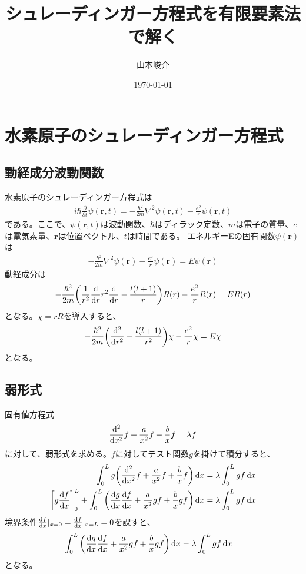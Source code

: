 \documentclass[xelatex,ja=standard]{bxjsarticle}
\title{シュレーディンガー方程式を有限要素法で解く}
\author{山本峻介}
\date{\today}
\begin{document}
\maketitle

\section{水素原子のシュレーディンガー方程式}
\subsection{動経成分波動関数}
水素原子のシュレーディンガー方程式は
\begin{align}
    i\hbar\frac{\partial}{\partial t}\psi(\bm{r},t) = -\frac{\hbar^2}{2m}\nabla^2\psi(\bm{r},t) -\frac{e^2}{r}\psi(\bm{r},t)
\end{align}
である。ここで、$\psi(\bm{r},t)$は波動関数、$\hbar$はディラック定数、$m$は電子の質量、$e$は電気素量、$\bm{r}$は位置ベクトル、$t$は時間である。
エネルギーEの固有関数$\psi(\bm{r})$は
\begin{align}
    -\frac{\hbar^2}{2m}\nabla^2\psi(\bm{r}) -\frac{e^2}{r}\psi(\bm{r}) = E\psi(\bm{r})
\end{align}
動経成分は
\begin{align}
    -\frac{\hbar^2}{2m}\qty(\frac{1}{r^2}\dv{r}r^2\dv{r} - \frac{l(l+1)}{r})R(r)
     - \frac{e^2}{r}R(r) = ER(r)
\end{align}
となる。$\chi = rR$を導入すると、
\begin{align}
    -\frac{\hbar^2}{2m}\qty(\dv[2]{r} - \frac{l(l+1)}{r^2})\chi - \frac{e^2}{r}\chi = E\chi
\end{align}
となる。

\subsection{弱形式}
固有値方程式
\begin{align}
    \dv[2]{x}f + \frac{a}{x^2}f + \frac{b}{x}f = \lambda f 
\end{align}
に対して、弱形式を求める。$f$に対してテスト関数$g$を掛けて積分すると、
\begin{align}
    \int_0^Lg\qty(\dv[2]{x}f + \frac{a}{x^2}f + \frac{b}{x}f)\dd{x} &= \lambda\int_0^Lgf\dd{x}\notag\\
    \qty[g\dv{f}{x}]_0^L+\int_0^L\qty(\dv{g}{x}\dv{f}{x} + \frac{a}{x^2}gf + \frac{b}{x}gf)\dd{x}
     &= \lambda\int_0^Lgf\dd{x}
\end{align}
境界条件$\dv{f}{x}|_{x=0} = \dv{f}{x}|_{x=L} = 0$を課すと、
\begin{align}
    \int_0^L\qty(\dv{g}{x}\dv{f}{x} + \frac{a}{x^2}gf + \frac{b}{x}gf)\dd{x}
     &= \lambda\int_0^Lgf\dd{x}
\end{align}
となる。
\end{document}
